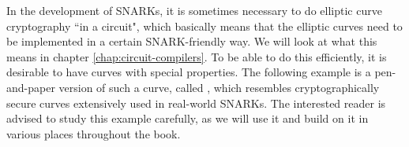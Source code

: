 In the development of SNARKs, it is sometimes necessary to do elliptic curve cryptography ``in a circuit", which basically means that the elliptic curves need to be implemented in a certain SNARK-friendly way. We will look at what this means in chapter \ref{chap:circuit-compilers}. To be able to do this efficiently, it is desirable to have curves with special properties. The following example is a pen-and-paper version of such a curve, called , which resembles cryptographically secure curves extensively used in real-world SNARKs. The interested reader is advised to study this example carefully, as we will use it and build on it in various places throughout the book. 

